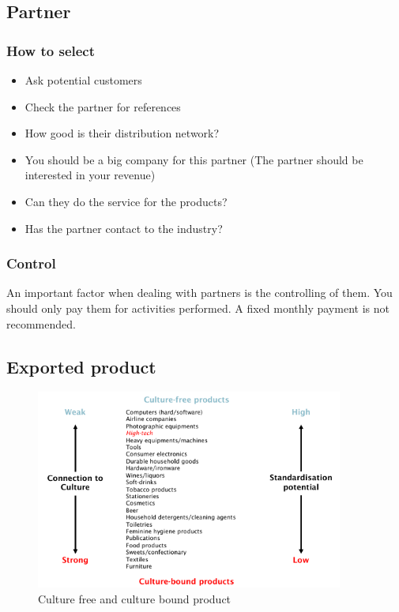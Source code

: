 \subsection{Partner}

\subsubsection{How to select}

\begin{itemize}
	\tightlist
	\item Ask potential customers
	\item Check the partner for references
	\item How good is their distribution network?
	\item You should be a big company for this partner (The partner should be interested in your revenue)
	\item Can they do the service for the products?
	\item Has the partner contact to the industry?
\end{itemize}

\subsubsection{Control}

An important factor when dealing with partners is the controlling of them. You should only pay them for activities performed. A fixed monthly payment is not recommended.

\subsection{Exported product}
\begin{figure}[H]
	\centering
	\includegraphics[width=0.9\textwidth]{figures/cultureProduct.png}
	\caption{Culture free and culture bound product}
\end{figure}


